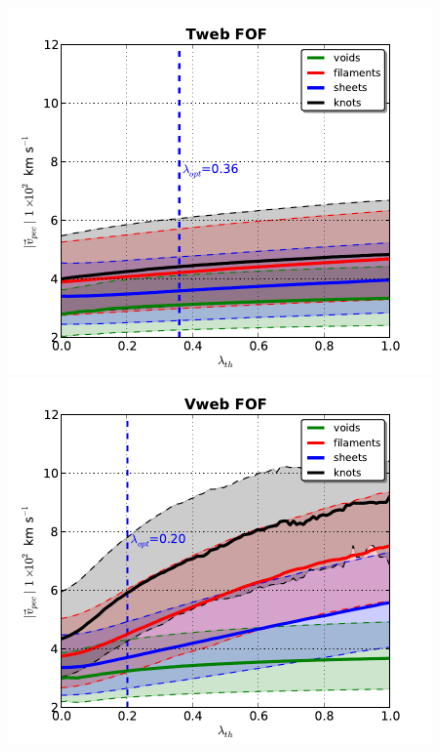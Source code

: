 \documentclass[a4,useAMS,usenatbib,usegraphicx]{latex/mn2e}
\begin{document}
\begin{flushleft}
\begin{figure}
  \includegraphics[trim = 0mm 0mm 0mm 0mm, clip, keepaspectratio=true,
  width=0.3\textheight]{./figures/halos_typical_velocity_FOF_Tweb.pdf}
  \includegraphics[trim = 0mm 0mm 0mm 0mm, clip, keepaspectratio=true,
  width=0.3\textheight]{./figures/halos_typical_velocity_FOF_Vweb.pdf}  
  

  \label{fig:typical_mass_velocity}
  \vspace{0.1 cm}

\end{figure}
\end{flushleft}
\end{document}
